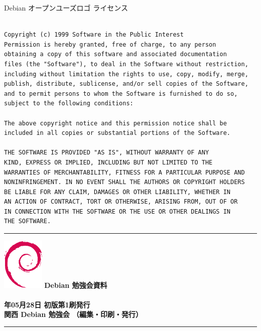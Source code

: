 \documentclass[mingoth,a4paper]{jsarticle}
\newcommand{\debmtgyear}{2017}
\newcommand{\debmtgdate}{28}
\newcommand{\debmtgmonth}{05}
\begin{document}
\begin{center}
Debian オープンユーズロゴ ライセンス
\end{center}

\begin{multicols}{2}
 \begin{fontsize}{6}{6}
 \begin{verbatim}

Copyright (c) 1999 Software in the Public Interest
Permission is hereby granted, free of charge, to any person
obtaining a copy of this software and associated documentation
files (the "Software"), to deal in the Software without restriction,
including without limitation the rights to use, copy, modify, merge,
publish, distribute, sublicense, and/or sell copies of the Software,
and to permit persons to whom the Software is furnished to do so,
subject to the following conditions:

The above copyright notice and this permission notice shall be
included in all copies or substantial portions of the Software.

THE SOFTWARE IS PROVIDED "AS IS", WITHOUT WARRANTY OF ANY
KIND, EXPRESS OR IMPLIED, INCLUDING BUT NOT LIMITED TO THE
WARRANTIES OF MERCHANTABILITY, FITNESS FOR A PARTICULAR PURPOSE AND
NONINFRINGEMENT. IN NO EVENT SHALL THE AUTHORS OR COPYRIGHT HOLDERS
BE LIABLE FOR ANY CLAIM, DAMAGES OR OTHER LIABILITY, WHETHER IN
AN ACTION OF CONTRACT, TORT OR OTHERWISE, ARISING FROM, OUT OF OR
IN CONNECTION WITH THE SOFTWARE OR THE USE OR OTHER DEALINGS IN
THE SOFTWARE.
 \end{verbatim}
 \end{fontsize}
\end{multicols}

\printindex

 \begin{minipage}[b]{0.2\hsize}
 \end{minipage}
 \begin{minipage}[b]{0.8\hsize}

 \vspace*{15cm}
 \rule{\hsize}{1mm}
 \vspace{2mm}
 \includegraphics[width=2cm]{image200502/openlogo-nd.eps}
 \noindent \Large \bfseries{Debian 勉強会資料}\\ \\
 \noindent \normalfont \debmtgyear{}年\debmtgmonth{}月\debmtgdate{}日 \hspace{5mm}  初版第1刷発行\\
 \noindent \normalfont 関西 Debian 勉強会 （編集・印刷・発行）\\
 \rule{\hsize}{1mm}
 \end{minipage}
\end{document}
